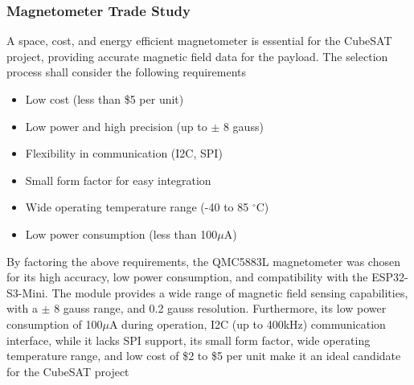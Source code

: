\documentclass{report}
\begin{document}
                \subsubsection{Magnetometer Trade Study}
                    A space, cost, and energy efficient magnetometer is essential for the CubeSAT project,
                    providing accurate magnetic field data for the payload. The selection process shall consider
                    the following requirements
                    \begin{itemize}
                        \item Low cost (less than \$5 per unit)
                        \item Low power and high precision (up to $\pm$ 8 gauss)
                        \item Flexibility in communication (I2C, SPI)
                        \item Small form factor for easy integration
                        \item Wide operating temperature range (-40 to 85 $^\circ$C)
                        \item Low power consumption (less than 100$\mu$A)
                    \end{itemize}
                    By factoring the above requirements, the QMC5883L magnetometer was chosen for its high accuracy,
                    low power consumption, and compatibility with the ESP32-S3-Mini. The module provides a wide range of magnetic field sensing capabilities,
                    with a $\pm$ 8 gauss range, and 0.2 gauss resolution. Furthermore, its low power consumption of 100$\mu$A during operation, I2C (up to 400kHz) communication interface,
                    while it lacks SPI support, its small form factor, wide operating temperature range, and low cost of \$2 to \$5 per unit make it an ideal candidate for the CubeSAT project \cite{qmcdatasheet}
\end{document}
